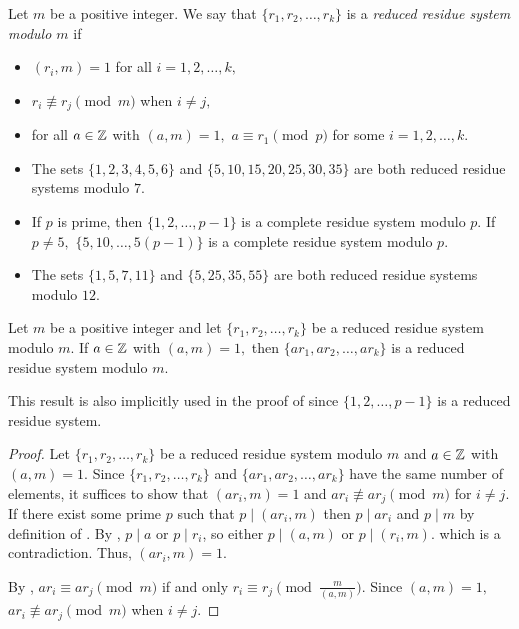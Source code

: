 \documentclass{ximera}
\begin{document}
\begin{defn}\label{defn:reduced-res-sys}
    Let $m$ be a positive integer. We say that $\{r_1,r_2,\dots,r_k\}$ is a \emph{reduced residue system modulo $m$} if 
    \begin{itemize}
        \item $(r_i,m)=1$ for all $i=1,2,\dots,k,$
        \item $r_i\not \equiv r_j \pmod {m}$ when $i\neq j,$
        \item for all $a\in\mathbb Z$ with $(a,m)=1,$ $a\equiv r_1\pmod{p}$ for some $i=1,2,\dots,k.$ 
    \end{itemize}
\end{defn}

\begin{example}\label{example:reduced-sys}
    
    \begin{itemize}
        \item The sets $\{1,2,3,4,5,6\}$ and $\{5,10,15,20,25,30,35\}$ are both reduced residue systems modulo $7.$
        
        \item If $p$ is prime, then $\{1,2,\dots,p-1\}$ is a complete residue system modulo $p.$ If $p\neq 5,$ $\{5,10,\dots, 5(p-1)\}$ is a complete residue system modulo $p.$
        
        \item The sets $\{1,5,7,11\}$ and $\{5,25,35,55\}$ are both reduced residue systems modulo $12.$
    \end{itemize}
\end{example}


\begin{lemma}\label{lem:reduced-sys}
    Let $m$ be a positive integer and let $\{r_1,r_2,\dots,r_k\}$ be a reduced residue system modulo $m.$ If $a\in\mathbb Z$ with $(a,m)=1,$ then $\{ar_1,ar_2,\dots,ar_k\}$ is a reduced residue system modulo $m.$
\end{lemma}
This result is also implicitly used in the proof of  since $\{1,2,\dots,p-1\}$ is a reduced residue system.

\begin{proof}
    Let $\{r_1,r_2,\dots,r_k\}$ be a reduced residue system modulo $m$ and $a\in\mathbb Z$ with $(a,m)=1.$ Since $\{r_1,r_2,\dots,r_k\}$ and $\{ar_1,ar_2,\dots,ar_k\}$ have the same number of elements, it suffices to show that $(ar_i,m)=1$ and  $ar_i\not\equiv ar_j\pmod{m}$ for $i\neq j.$ If there exist some prime $p$ such that $p\mid(ar_i,m)$ then $p\mid ar_i$ and $p\mid m$ by definition of . By , $p\mid a$ or $p\mid r_i$, so either $p\mid (a,m)$ or $p\mid (r_i,m).$ which is a contradiction. Thus, $(ar_i,m)=1.$

    By , $ar_i\equiv ar_j\pmod{m}$ if and only $r_i\equiv r_j \pmod{\tfrac{m}{(a,m)}}.$ Since $(a,m)=1,$ $ar_i\not\equiv ar_j\pmod{m}$ when $i\neq j$.
\end{proof}
\end{document}
